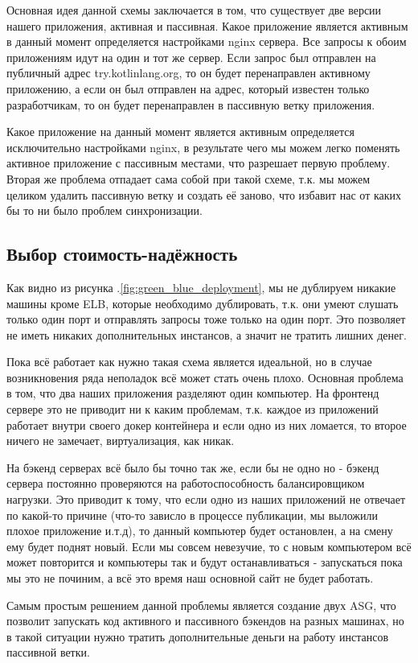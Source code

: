 	Основная идея данной схемы заключается в том, что существует две версии нашего приложения, активная и пассивная. Какое приложение является активным в данный момент определяется настройками nginx сервера. Все запросы к обоим приложениям идут на один и тот же сервер. Если запрос был отправлен на публичный адрес try.kotlinlang.org, то он будет перенаправлен активному приложению, а если он был отправлен на адрес, который известен только разработчикам, то он будет перенаправлен в пассивную ветку приложения.
	
	Какое приложение на данный момент является активным определяется исключительно настройками nginx, в результате чего мы можем легко поменять активное приложение с пассивным местами, что разрешает первую проблему. Вторая же проблема отпадает сама собой при такой схеме, т.к. мы можем целиком удалить пассивную ветку и создать её заново, что избавит нас от каких бы то ни было проблем синхронизации.
\subsection{Выбор стоимость-надёжность}
	Как видно из рисунка .\ref{fig:green_blue_deployment}, мы не дублируем никакие машины кроме ELB, которые необходимо дублировать, т.к. они умеют слушать только один порт и отправлять запросы тоже только на один порт. Это позволяет не иметь никаких дополнительных инстансов, а значит не тратить лишних денег.
	
	Пока всё работает как нужно такая схема является идеальной, но в случае возникновения ряда неполадок всё может стать очень плохо. Основная проблема в том, что два наших приложения разделяют один компьютер. На фронтенд сервере это не приводит ни к каким проблемам, т.к. каждое из приложений работает внутри своего докер контейнера и если одно из них ломается, то второе ничего не замечает, виртуализация, как никак.
	
	На бэкенд серверах всё было бы точно так же, если бы не одно но - бэкенд сервера постоянно проверяются на работоспособность балансировщиком нагрузки. Это приводит к тому, что если одно из наших приложений не отвечает по какой-то причине (что-то зависло в процессе публикации, мы выложили плохое приложение и.т.д), то данный компьютер будет остановлен, а на смену ему будет поднят новый. Если мы совсем невезучие, то с новым компьютером всё может повторится и компьютеры так и будут останавливаться - запускаться пока мы это не починим, а всё это время наш основной сайт не будет работать.
	
	Самым простым решением данной проблемы является создание двух ASG, что позволит запускать код активного и пассивного бэкендов на разных машинах, но в такой ситуации нужно тратить дополнительные деньги на работу инстансов пассивной ветки.